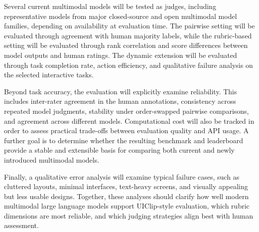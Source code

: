 \documentclass[pdflatex,sn-mathphys-num]{sn-jnl}
\begin{document}
Several current multimodal models will be tested as judges, including representative
models from major closed-source and open multimodal model families, depending on
availability at evaluation time. The pairwise setting will be evaluated through
agreement with human majority labels, while the rubric-based setting will be evaluated
through rank correlation and score differences between model outputs and human ratings.
The dynamic extension will be evaluated through task completion rate, action
efficiency, and qualitative failure analysis on the selected interactive tasks.

Beyond task accuracy, the evaluation will explicitly examine reliability. This includes
inter-rater agreement in the human annotations, consistency across repeated model
judgments, stability under order-swapped pairwise comparisons, and agreement across
different models. Computational cost will also be tracked in order to assess practical
trade-offs between evaluation quality and API usage. A further goal is to determine
whether the resulting benchmark and leaderboard provide a stable and extensible basis
for comparing both current and newly introduced multimodal models.

Finally, a qualitative error analysis will examine typical failure cases, such as
cluttered layouts, minimal interfaces, text-heavy screens, and visually appealing but
less usable designs. Together, these analyses should clarify how well modern
multimodal large language models support UIClip-style evaluation, which rubric
dimensions are most reliable, and which judging strategies align best with human
assessment.

\backmatter

{\footnotesize\setlength{\bibsep}{0pt}}
\end{document}
